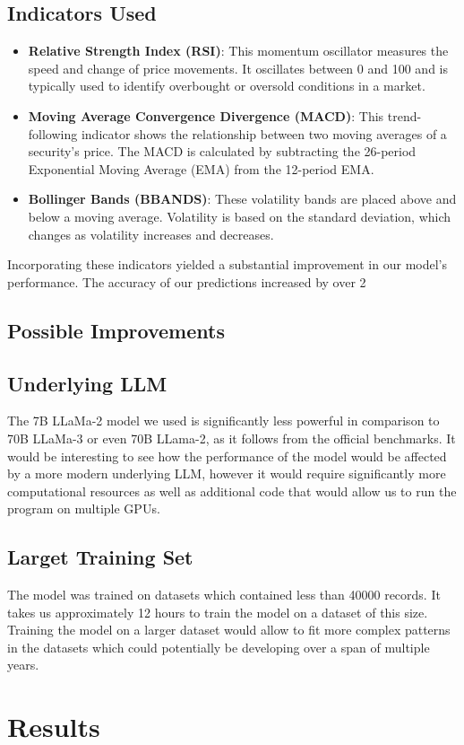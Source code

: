 \subsection{Indicators Used}

\begin{itemize}
    \item \textbf{Relative Strength Index (RSI)}: This momentum oscillator measures the speed and change of price movements. It oscillates between 0 and 100 and is typically used to identify overbought or oversold conditions in a market.
    \item \textbf{Moving Average Convergence Divergence (MACD)}: This trend-following indicator shows the relationship between two moving averages of a security's price. The MACD is calculated by subtracting the 26-period Exponential Moving Average (EMA) from the 12-period EMA.
    \item \textbf{Bollinger Bands (BBANDS)}: These volatility bands are placed above and below a moving average. Volatility is based on the standard deviation, which changes as volatility increases and decreases.
\end{itemize}

Incorporating these indicators yielded a substantial improvement in our model's performance. The accuracy of our predictions increased by over 2%

\subsection{Possible Improvements}

\subsection{Underlying LLM}
The 7B LLaMa-2 model we used is significantly less powerful in comparison to 70B LLaMa-3 or even 70B LLama-2, as it follows from the official benchmarks. It would be interesting to see how the performance of the model would be affected by a more modern underlying LLM, however it would require significantly more computational resources as well as additional code that would allow us to run the program on multiple GPUs.  

\subsection{Larget Training Set}
The model was trained on datasets which contained less than 40000 records. It takes us approximately 12 hours to train the model on a dataset of this size. Training the model on a larger dataset would allow to fit more complex patterns in the datasets which could potentially be developing over a span of multiple years. 
\section{Results}
